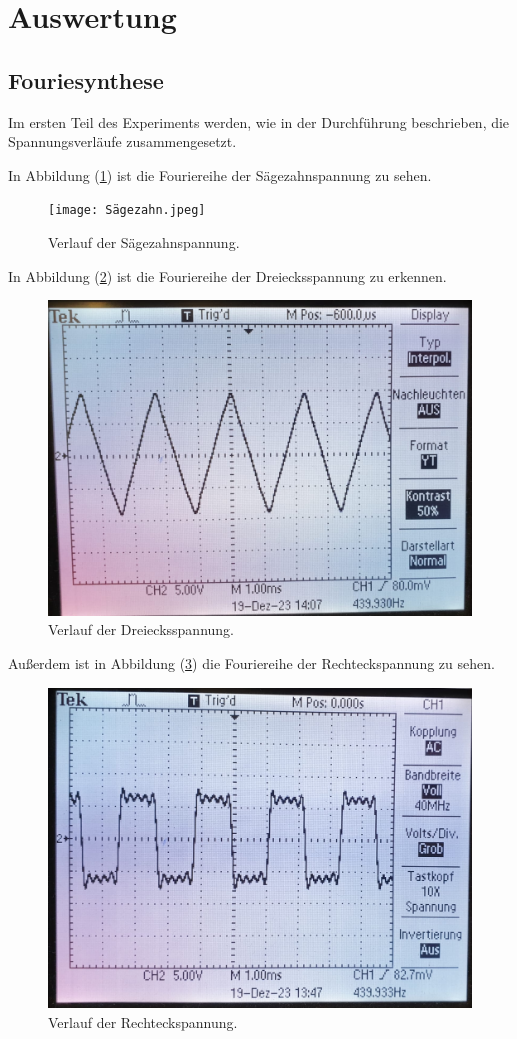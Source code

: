 \section{Auswertung}
\label{sec:Auswertung}

\subsection{Fouriesynthese}
Im ersten Teil des Experiments werden, wie in der Durchführung beschrieben, die Spannungsverläufe zusammengesetzt. 

In Abbildung (\ref{fig:plot1}) ist die Fouriereihe der Sägezahnspannung zu sehen.
\begin{figure}[H]
  \centering
  \texttt{[image: Sägezahn.jpeg]}
  \caption{Verlauf der Sägezahnspannung.}
  \label{fig:plot1}
\end{figure}

In Abbildung (\ref{fig:plot2}) ist die Fouriereihe der Dreiecksspannung zu erkennen. 
\begin{figure}[H]
  \centering
  \includegraphics[width = 0.6\linewidth]{Dreieck.jpeg}
  \caption{Verlauf der Dreiecksspannung.}
  \label{fig:plot2}
\end{figure}

Außerdem ist in Abbildung (\ref{fig:plot3}) die Fouriereihe der Rechteckspannung zu sehen.
\begin{figure}[H]
  \centering
  \includegraphics[width = 0.6\linewidth]{Viereck.jpeg}
  \caption{Verlauf der Rechteckspannung.}
  \label{fig:plot3}
\end{figure}

